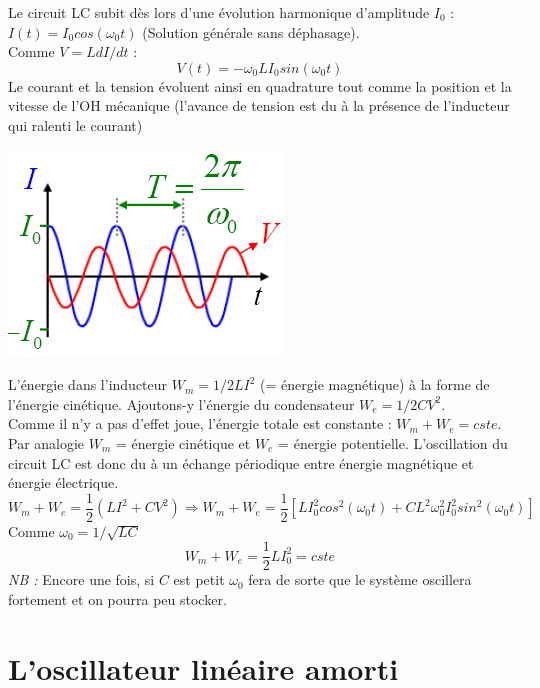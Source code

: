 \documentclass	[11pt, a4paper, openany]{book}
\begin{document}
	Le circuit LC subit dès lors d'une évolution harmonique d'amplitude $I_0$ : $I(t) = I_0 cos(\omega_0 t)$ (Solution générale sans déphasage).\\
	Comme $V = LdI/dt$ :
	\begin{equation}
		V(t) = -\omega_0LI_0sin(\omega_0 t)
	\end{equation}
	Le courant et la tension évoluent ainsi en quadrature tout comme la position et la vitesse de l'OH mécanique (l'avance de tension est du à la présence de l'inducteur qui ralenti le courant)
	\begin{center}
		\includegraphics[scale=0.45]{oo/image6.png}
	\end{center}
	L'énergie dans l'inducteur $W_m = 1/2LI^2$ (= énergie magnétique) à la forme de l'énergie cinétique. Ajoutons-y l'énergie du condensateur $W_e = 1/2CV^2$.\\
	Comme il n'y a pas d'effet joue, l'énergie totale est constante : $W_m + W_e = cste$.\\
	
	Par analogie $W_m$ = énergie cinétique et $W_e$ = énergie potentielle. L'oscillation du circuit LC est donc du à un échange périodique entre énergie magnétique et énergie électrique.
	\begin{equation}
		W_m + W_e = \frac{1}{2}(LI^2 + CV^2) \Rightarrow W_m + W_e = \frac{1}{2}\left[LI_0^2cos^2(\omega_0 t) + CL^2\omega_0^2I^2_0sin^2(\omega_0 t)\right]
	\end{equation}
	Comme $\omega_0 = 1/\sqrt{LC}$
	\begin{equation}
		W_m + W_e = \frac{1}{2}LI^2_0 = cste
	\end{equation}
	\textit{NB :} Encore une fois, si $C$ est petit $\omega_0$ fera de sorte que le système oscillera fortement et on pourra peu stocker.
	
	\section{L'oscillateur linéaire amorti}
\end{document}
